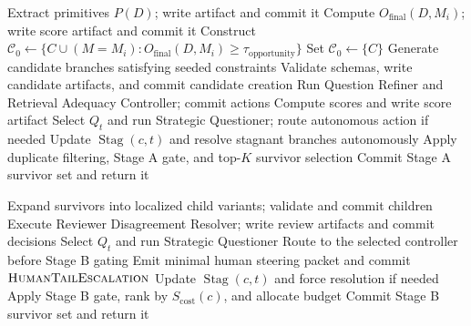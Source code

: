 \documentclass[11pt]{article}
\newcommand{\Cands}{\mathcal{C}}
\begin{document}
\begin{algorithm}[H]
\footnotesize
\caption{Opportunity Discovery and Stage A Expansion}
\begin{algorithmic}[1]
    \State Extract primitives $P(D)$; write artifact and commit it
        \State Compute $O_{\text{final}}(D,M_i)$; write score artifact and commit it
    \EndFor
    \State Construct $\mathcal{C}_{0}\gets\{C\cup(M=M_i):O_{\text{final}}(D,M_i)\geq\tau_{\text{opportunity}}\}$
\Else
    \State Set $\mathcal{C}_{0}\gets\{C\}$
\EndIf
\State Generate candidate branches satisfying seeded constraints
\State Validate schemas, write candidate artifacts, and commit candidate creation
    \State Run Question Refiner and Retrieval Adequacy Controller; commit actions
    \State Compute scores and write score artifact
    \State Select $Q_t$ and run Strategic Questioner; route autonomous action if needed
    \State Update $\operatorname{Stag}(c,t)$ and resolve stagnant branches autonomously
\EndFor
\State Apply duplicate filtering, Stage A gate, and top-$K$ survivor selection
\State Commit Stage A survivor set and return it
\EndFunction
\end{algorithmic}
\end{algorithm}

\begin{algorithm}[H]
\footnotesize
\caption{Stage B Structural Validation}
\begin{algorithmic}[1]
\Function{StageB\_StructuralValidation}{$\Cands_A,\mathbf{B}$}
\State Expand survivors into localized child variants; validate and commit children
\State Execute Reviewer Disagreement Resolver; write review artifacts and commit decisions
    \State Select $Q_t$ and run Strategic Questioner
        \State Route to the selected controller before Stage B gating
        \State Emit minimal human steering packet and commit $\textsc{HumanTailEscalation}$
    \EndIf
    \State Update $\operatorname{Stag}(c,t)$ and force resolution if needed
\EndFor
\State Apply Stage B gate, rank by $S_{\text{cost}}(c)$, and allocate budget
\State Commit Stage B survivor set and return it
\EndFunction
\end{algorithmic}
\end{algorithm}
\end{document}

